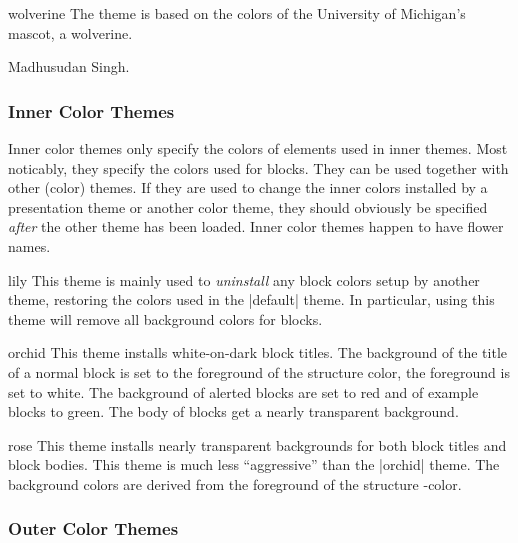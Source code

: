 \begin{colorthemeexample}{wolverine}
  The theme is based on the colors of the University of Michigan's
  mascot, a wolverine. 

  \themeauthor Madhusudan Singh.
\end{colorthemeexample}


\subsubsection{Inner Color Themes}

Inner color themes only specify the colors of elements used in inner
themes. Most noticably, they specify the colors used for blocks. They can
be used together with other (color) themes. If they are used to change the
inner colors installed by a presentation theme or another color theme,
they should obviously be specified \emph{after} the other theme has
been loaded. Inner color themes happen to have flower names.

\begin{colorthemeexample}{lily}
  This theme is mainly used to \emph{uninstall} any block colors setup
  by another theme, restoring the colors used in the |default|
  theme. In particular, using this theme will remove all background
  colors for blocks.
\end{colorthemeexample}

\begin{colorthemeexample}{orchid}
  This theme installs white-on-dark block titles. The background of
  the title of a normal block is set to the foreground of the
  structure color, the foreground is set to white. The background of
  alerted blocks are set to red and of example blocks to green. The
  body of blocks get a nearly transparent background.
\end{colorthemeexample}

\begin{colorthemeexample}{rose}
  This theme installs nearly transparent backgrounds for both block
  titles and block bodies. This theme is much less ``aggressive'' than
  the |orchid| theme. The background colors are derived from the
  foreground of the structure \beamer-color.
\end{colorthemeexample}


\subsubsection{Outer Color Themes}

